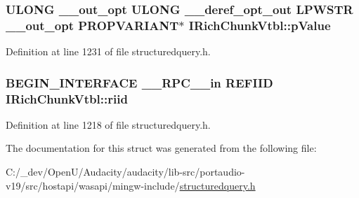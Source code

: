 \subsubsection[{\texorpdfstring{p\+Value}{pValue}}]{ {\bf U\+L\+O\+NG} {\bf \+\_\+\+\_\+out\+\_\+opt} {\bf U\+L\+O\+NG} {\bf \+\_\+\+\_\+deref\+\_\+opt\+\_\+out} {\bf L\+P\+W\+S\+TR} {\bf \+\_\+\+\_\+out\+\_\+opt} {\bf P\+R\+O\+P\+V\+A\+R\+I\+A\+NT}$\ast$ I\+Rich\+Chunk\+Vtbl\+::p\+Value}\hypertarget{struct_i_rich_chunk_vtbl_a3c5e271fe4f7418362a259c42f33babc}{}\label{struct_i_rich_chunk_vtbl_a3c5e271fe4f7418362a259c42f33babc}


Definition at line 1231 of file structuredquery.\+h.

\subsubsection[{\texorpdfstring{riid}{riid}}]{\setlength{\rightskip}{0pt plus 5cm}B\+E\+G\+I\+N\+\_\+\+I\+N\+T\+E\+R\+F\+A\+CE {\bf \+\_\+\+\_\+\+R\+P\+C\+\_\+\+\_\+in} {\bf R\+E\+F\+I\+ID} I\+Rich\+Chunk\+Vtbl\+::riid}\hypertarget{struct_i_rich_chunk_vtbl_a59fa8bbd08359efd8efb56ecc9561eb5}{}\label{struct_i_rich_chunk_vtbl_a59fa8bbd08359efd8efb56ecc9561eb5}


Definition at line 1218 of file structuredquery.\+h.



The documentation for this struct was generated from the following file\+:\begin{DoxyCompactItemize}
\item 
C\+:/\+\_\+dev/\+Open\+U/\+Audacity/audacity/lib-\/src/portaudio-\/v19/src/hostapi/wasapi/mingw-\/include/\hyperlink{structuredquery_8h}{structuredquery.\+h}\end{DoxyCompactItemize}
